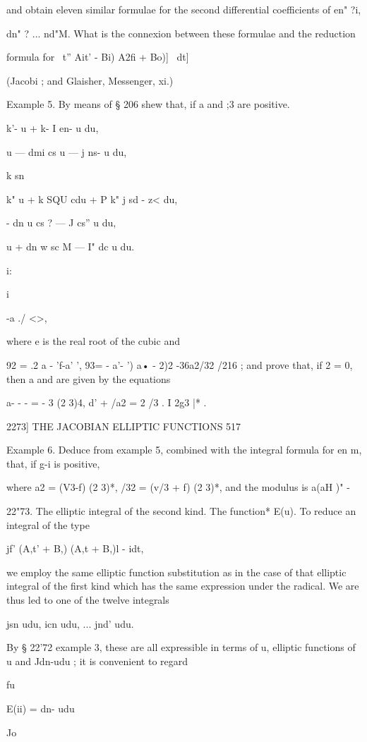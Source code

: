 and obtain eleven similar formulae for the second differential
coefficients of en" ?i,

dn" ? ... nd"M. What is the connexion between these formulae and the
reduction

formula for \ t'' Ait' - Bi) A2fi + Bo)]~ dt]

(Jacobi ; and Glaisher, Messenger, xi.)

Example 5. By means of § 206 shew that, if a and ;3 are positive.

k'- u + k- I en- u du,

u — dmi cs u — j ns- u du,

k sn %

k" u + k SQU cdu + P k" j sd - z< du,

- dn u cs ? — J cs'' u du,

u + dn w sc M — I" dc u du.

i:

 i

-a ./ <>,

where e is the real root of the cubic and

92 = .2 a - 'f-a' ', 93= - a'- ') a• - 2)2 -36a2/32 /216 ; and prove
that, if 2 = 0, then a and are given by the equations

a- - - = - 3 (2 3)4, d' + /a2 = 2 /3 . I 2g3 |* .

2273] THE JACOBIAN ELLIPTIC FUNCTIONS 517

Example 6. Deduce from example 5, combined with the integral formula
for en m, that, if g-i is positive,

where a2 = (V3-f) (2 3)*, /32 = (v/3 + f) (2 3)*, and the modulus is
a(aH )" -

22"73. The elliptic integral of the second kind. The function* E(u).
To reduce an integral of the type

jf' (A,t' + B,) (A,t + B,)l - idt,

we employ the same elliptic function substitution as in the case of
that elliptic integral of the first kind which has the same expression
under the radical. We are thus led to one of the twelve integrals

jsn udu, icn udu, ... jnd' udu.

By § 22'72 example 3, these are all expressible in terms of u,
elliptic functions of u and Jdn-udu ; it is convenient to regard

fu

E(ii) = dn- udu

Jo

